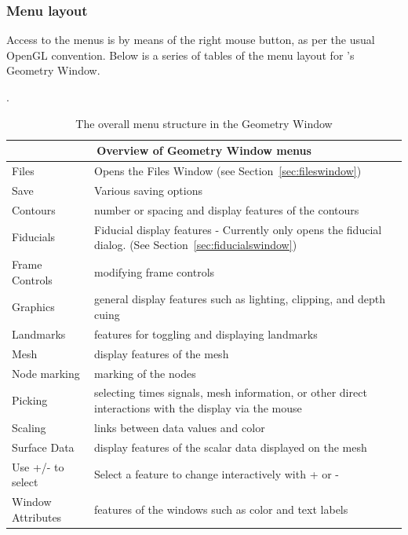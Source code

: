 \subsubsection{Menu layout}
\label{sec:control-menus}

Access to the menus is by means of the right mouse button, as per the usual
OpenGL convention.  Below is a series of tables of the menu layout for
\map{}'s Geometry Window.

\begin{table}[ht]
\caption{\label{table:menu-geom}
  The overall menu structure in the Geometry Window}.
  \begin{center}
    \begin{tabular}{|l|p{4in}|} \hline
      \multicolumn{2}{|c|}{\textbf{Overview of Geometry Window menus}} \\
      \hline \hline 
      Files & Opens the Files Window (see Section~\ref{sec:fileswindow}) \\
      Save & Various saving options \\
      Contours & number or spacing and display features of the contours \\
      Fiducials & Fiducial display features - Currently only opens the fiducial
        dialog.  (See Section~\ref{sec:fiducialswindow})\\
      Frame Controls & modifying frame controls\\
      Graphics & general display features such as lighting, clipping,
        and depth cuing \\
      Landmarks & features for toggling and displaying landmarks \\ 
      Mesh & display features of the mesh \\
      Node marking & marking of the nodes \\
      Picking & selecting times signals, mesh information, or other direct
      interactions with the display via the mouse\\
      Scaling & links between data values and color\\
      Surface Data & display features of the scalar data displayed on the
      mesh \\  
      Use +/- to select & Select a feature to change interactively with + or -
      \\
      Window Attributes & features of the windows such as color and text
      labels \\ \hline
    \end{tabular}
  \end{center}
\end{table}

